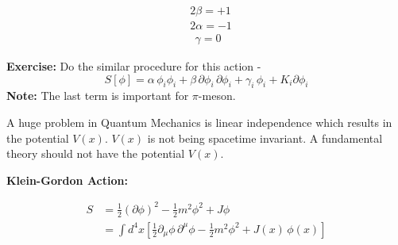 \documentclass[14pt]{article} %
\begin{document}
\begin{align*}
    & 2\beta = +1 \\
    & 2\alpha = -1 \\
    & ~~\gamma = 0
\end{align*}
\begin{framed}
\textbf{Exercise:} Do the similar procedure for this action -
\[
S[\phi] = \alpha\, \phi_i \phi_i + \beta\, \partial \phi_i \, \partial \phi_i + \gamma_i\, \phi_i + K_i \partial \phi_i
\]
\textbf{Note:} The last term is important for $\pi$-meson.
\end{framed}
\begin{tcolorbox}[ title=Note]
A huge problem in Quantum Mechanics is linear independence which results in the potential \( V(x)\). $V(x)$ is not being spacetime invariant. A fundamental theory should not have the potential \( V(x) \).
\end{tcolorbox}

\textbf{Klein-Gordon Action:}

\begin{align*}
S &= \frac{1}{2} (\partial \phi)^2 - \frac{1}{2} m^2 \phi^2 + J\phi \\
  &= \int d^4x \left[ \frac{1}{2} \partial_\mu \phi \,\partial^\mu \phi - \frac{1}{2} m^2 \phi^2 + J(x)\, \phi(x) \right]
\end{align*}
\end{document}
